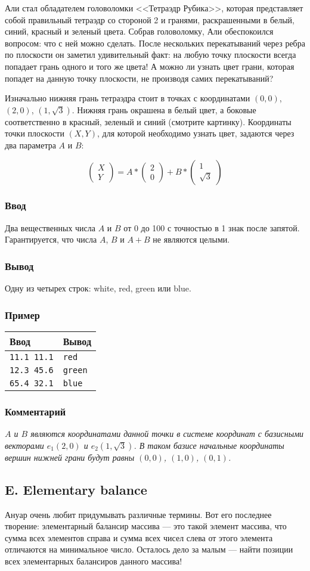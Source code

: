 \documentclass[10pt, a4paper]{article}
\newcommand{\informat}[1]
{
	\subsubsection*{Ввод} #1
}
\newcommand{\outformat}[1]
{
	\subsubsection*{Вывод} #1
}
\newcommand{\exampleee}[6]
{
	\subsubsection*{Пример}
	\noindent
	\begin{center}
	\begin{tabularx}{\linewidth}{|X|X|}
	\hline
	Ввод 	& Вывод  	\\
	\hline
	{\tt #1} & {\tt #2}	\\
	\hline
	{\tt #3} & {\tt #4}	\\
	\hline
	{\tt #5} & {\tt #6}	\\
	\hline
	\end{tabularx}
	\end{center}
}
\newcommand{\excomm}[1]
{
	\subsubsection*{Комментарий}
	\textit{#1}
}
\begin{document}
Али  стал обладателем головоломки <<Тетраэдр Рубика>>, которая представляет собой правильный тетраэдр со стороной 2 и гранями, раскрашенными в белый, синий, красный и зеленый цвета. Собрав головоломку, Али обеспокоился вопросом: что с ней можно сделать. После нескольких перекатываний через ребра по плоскости он заметил удивительный факт: на любую точку плоскости всегда попадает грань одного и того же цвета! А можно ли узнать цвет грани, которая попадет на данную точку плоскости, не производя самих перекатываний?



Изначально нижняя грань тетраэдра стоит в точках с координатами $(0, 0)$, $(2, 0)$, $(1, \sqrt{3})$. Нижняя грань окрашена в белый цвет, а боковые соответственно в красный, зеленый и синий (смотрите картинку). Координаты точки плоскости $(X, Y)$, для которой необходимо узнать цвет, задаются через два параметра $A$ и $B$:

$$
\begin{pmatrix}
X \\
Y
\end{pmatrix}
= 
A * 
\begin{pmatrix}
2 \\
0
\end{pmatrix}
+ B * 
\begin{pmatrix}
1 \\
\sqrt{3}
\end{pmatrix}
$$

\informat{Два вещественных числа $A$ и $B$ от 0 до 100 с точностью в 1 знак после запятой. Гарантируется, что числа $A$, $B$ и $A + B$ не являются целыми.}

\outformat{Одну из четырех строк: white, red, green или blue.}

\exampleee{11.1 11.1}{red}{12.3 45.6}{green}{65.4 32.1}{blue}

\excomm{$A$ и $B$ являются координатами данной точки в системе координат с базисными векторами $e_1(2, 0)$ и $e_2(1, \sqrt{3})$. В таком базисе начальные координаты вершин нижней грани будут равны $(0, 0)$, $(1, 0)$, $(0, 1)$.}

\newpage


\subsection*{E. Elementary balance}

Ануар очень любит придумывать различные термины. Вот его последнее творение: элементарный балансир массива --- это такой элемент массива, что сумма всех элементов справа и сумма всех чисел слева от этого элемента отличаются на минимальное число. Осталось дело за малым --- найти позиции всех элементарных балансиров данного массива!
\end{document}
